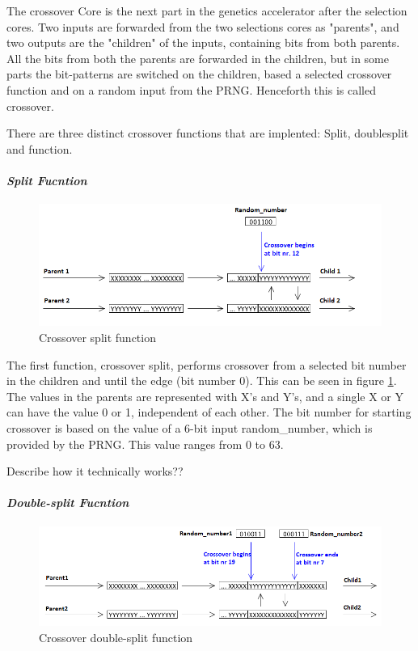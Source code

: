 The crossover Core is the next part in the genetics accelerator after the selection cores. Two inputs are forwarded from the two selections cores as "parents", and two outputs are the "children" of the inputs, containing bits from both parents. All the bits from both the parents are forwarded in the children, but in some parts the bit-patterns are switched on the children, based a selected crossover function and on a random input from the PRNG. Henceforth this is called crossover.

There are three distinct crossover functions that are implented: Split, doublesplit and function.

\paragraph{\textit{Split Fucntion}}
\begin{figure}[H]
\includegraphics[width=\textwidth]{fpga/fig/crossover_split.png}
\caption{Crossover split function}
\label{fig_crossover_split}
\end{figure}

The first function, crossover split, performs crossover from a selected bit number in the children and until the edge (bit number 0). This can be seen in figure \ref{fig_crossover_split}. The values in the parents are represented with X's and Y's, and a single X or Y can have the value 0 or 1, independent of each other.
The bit number for starting crossover is based on the value of a 6-bit input random\_number, which is provided by the PRNG. This value ranges from 0 to 63.

\todo Describe how it technically works??

\paragraph{\textit{Double-split Fucntion}}
\begin{figure}[H]
\includegraphics[width=\textwidth]{fpga/fig/crossover_doublesplit.png}
\caption{Crossover double-split function}
\label{fig_crossover_doublesplit}
\end{figure}

